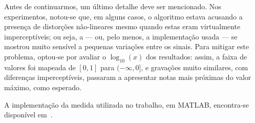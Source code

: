 Antes de continuarmos, um último detalhe deve ser mencionado. Nos experimentos, notou-se que, em alguns casos, o algoritmo estava acusando a presença de distorções não-lineares mesmo quando estas eram virtualmente imperceptíveis; ou seja, a \rnonlin{} --- ou, pelo menos, a implementação usada --- se mostrou muito sensível a pequenas variações entre os sinais. Para mitigar este problema, optou-se por avaliar o $\log_{10}(x)$ dos resultados: assim, a faixa de valores foi mapeada de $[0, 1]$ para $(-\infty, 0]$, e gravações muito similares, com diferenças imperceptíveis, passaram a apresentar notas mais próximas do valor máximo, como esperado.

A implementação da medida utilizada no trabalho, em MATLAB, encontra-se disponível em~\cite{rnonlin-calc}.

